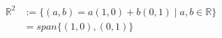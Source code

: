 \documentclass[preview]{standalone}
\begin{document}
\begin{align*}
\mathbb{R}^2&  := \{ (a,b)= a(1,0)+b(0,1) \mid a , b \in \mathbb{R} \} \\ & = span \{ (1,0) , (0,1) \}
\end{align*}
\end{document}

